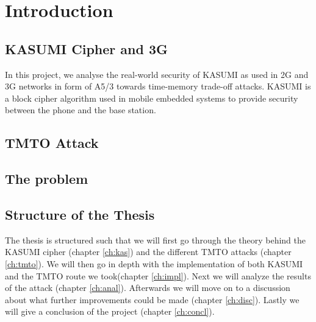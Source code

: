 \chapter{Introduction}

\section{KASUMI Cipher and 3G}

In this project, we analyse the real-world security of KASUMI as used
in 2G and 3G networks in form of A5/3 towards time-memory trade-off
attacks. KASUMI is a block cipher algorithm used in mobile embedded
systems to provide security between the phone and the base station. 

\section{TMTO Attack}



\section{The problem}



\section{Structure of the Thesis}

The thesis is structured such that we will first go through the theory
behind the KASUMI cipher (chapter \ref{ch:kas}) and the different TMTO
attacks (chapter \ref{ch:tmto}). We will then go in depth with the
implementation of both KASUMI and the TMTO route we took(chapter
\ref{ch:impl}). Next we will analyze the results of the attack
(chapter \ref{ch:anal}). Afterwards we will move on to a discussion
about what further improvements could be made (chapter
\ref{ch:disc}). Lastly we will give a conclusion of the project
(chapter \ref{ch:concl}).

